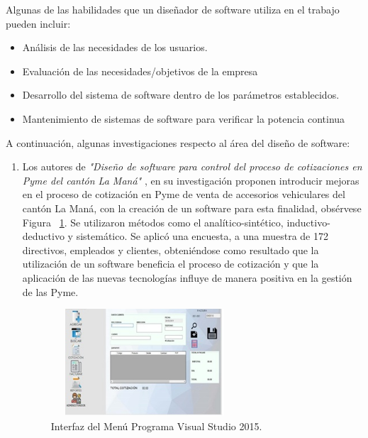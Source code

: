 \documentclass[10pt,conference]{IEEEtran}
\begin{document}
Algunas de las habilidades que un diseñador de software utiliza en el trabajo pueden incluir:
\begin{itemize}
    \item Análisis de las necesidades de los usuarios.
    \item Evaluación de las necesidades/objetivos de la empresa
    \item Desarrollo del sistema de software dentro de los parámetros establecidos.
    \item Mantenimiento de sistemas de software para verificar la potencia continua
\end{itemize}

A continuación, algunas investigaciones respecto al área del diseño de software:

\begin{enumerate}
\item Los autores de \textit{"Diseño de software para control del proceso de cotizaciones en Pyme del cantón La Maná"} \citep{albarracin2022diseno}, en su investigación proponen introducir mejoras en el proceso de cotización en Pyme de venta de accesorios vehiculares del cantón La Maná, con la creación de un software para esta finalidad, obsérvese Figura ~\ref{fmana}. Se utilizaron métodos como el analítico-sintético, inductivo-deductivo y sistemático. Se aplicó una encuesta, a una muestra de 172 directivos, empleados y clientes, obteniéndose como resultado que la utilización de un software beneficia el proceso de cotización y que la aplicación de las nuevas tecnologías influye de manera positiva en la gestión de las Pyme.

\begin{figure}[H]
 \begin{center}
       \includegraphics[width=7cm, height=4cm]{figuras/mana.JPG}
      \caption{Interfaz del Menú Programa Visual Studio 2015.}
      \label{fmana} 
      \end{center}
\end{figure}


\end{enumerate}
\end{document}
